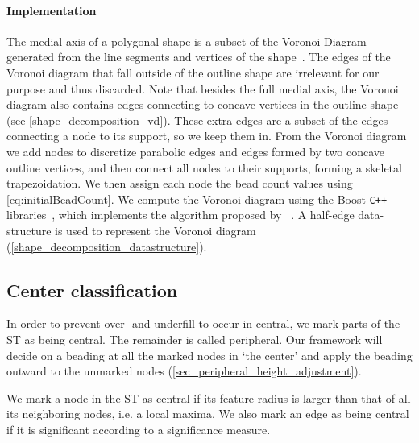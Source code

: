 \paragraph{Implementation}
The medial axis of a polygonal shape is a subset of the Voronoi Diagram generated from the line segments and vertices of the shape~\cite{lee1982medial}. 
The edges of the Voronoi diagram that fall outside of the outline shape are irrelevant for our purpose and thus discarded.
Note that besides the full medial axis, the Voronoi diagram also contains edges connecting to concave vertices in the outline shape (see \cref{shape_decomposition_vd}). 
These extra edges are a subset of the edges connecting a node to its support, so we keep them in.
From the Voronoi diagram we add nodes to discretize parabolic edges and edges formed by two concave outline vertices, and then connect all nodes to their supports, forming a skeletal trapezoidation. 
We then assign each node the bead count values using \cref{eq:initialBeadCount}.
We compute the Voronoi diagram using the Boost \verb!C++! libraries~\cite{schaling2011boost}, which implements the algorithm proposed by \citeauthor{fortune1986sascg}~\cite{fortune1986sascg}.
A half-edge data-structure is used to represent the Voronoi diagram (\cref{shape_decomposition_datastructure}).

%









\subsection{Center classification}\label{sec_center_classification}
In order to prevent over- and underfill to occur in central, we mark parts of the ST as being central.
The remainder is called peripheral.
Our framework will decide on a beading at all the marked nodes in `the center' and apply the beading outward to the unmarked nodes (\cref{sec_peripheral_height_adjustment}).

We mark a node in the ST as central if its feature radius is larger than that of all its neighboring nodes, i.e. a local maxima.
We also mark an edge as being central if it is significant according to a significance measure.

